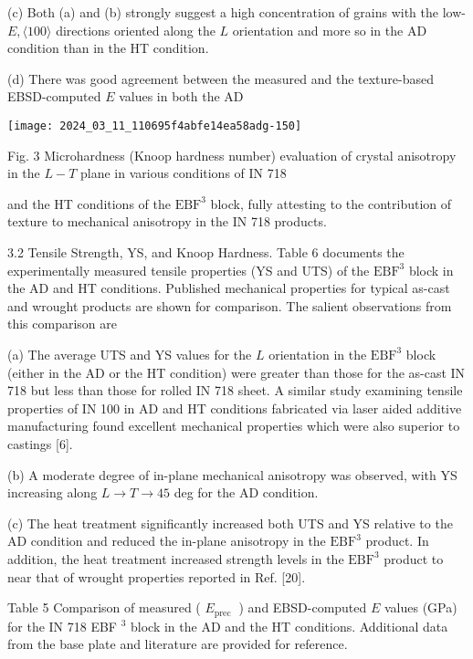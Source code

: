 \documentclass[10pt]{article}
\begin{document}
(c) Both (a) and (b) strongly suggest a high concentration of grains with the low- $E,\langle 100\rangle$ directions oriented along the $L$ orientation and more so in the AD condition than in the HT condition.

(d) There was good agreement between the measured and the texture-based EBSD-computed $E$ values in both the AD

\begin{center}
\texttt{[image: 2024\_03\_11\_110695f4abfe14ea58adg-150]}
\end{center}

Fig. 3 Microhardness (Knoop hardness number) evaluation of crystal anisotropy in the $L-T$ plane in various conditions of IN 718

and the HT conditions of the $\mathrm{EBF}^{3}$ block, fully attesting to the contribution of texture to mechanical anisotropy in the IN 718 products.

3.2 Tensile Strength, YS, and Knoop Hardness. Table 6 documents the experimentally measured tensile properties (YS and UTS) of the $\mathrm{EBF}^{3}$ block in the AD and HT conditions. Published mechanical properties for typical as-cast and wrought products are shown for comparison. The salient observations from this comparison are

(a) The average UTS and YS values for the $L$ orientation in the $\mathrm{EBF}^{3}$ block (either in the AD or the HT condition) were greater than those for the as-cast IN 718 but less than those for rolled IN 718 sheet. A similar study examining tensile properties of IN 100 in AD and HT conditions fabricated via laser aided additive manufacturing found excellent mechanical properties which were also superior to castings [6].

(b) A moderate degree of in-plane mechanical anisotropy was observed, with YS increasing along $L \rightarrow T \rightarrow 45$ deg for the $\mathrm{AD}$ condition.

(c) The heat treatment significantly increased both UTS and YS relative to the AD condition and reduced the in-plane anisotropy in the $\mathrm{EBF}^{3}$ product. In addition, the heat treatment increased strength levels in the $\mathrm{EBF}^{3}$ product to near that of wrought properties reported in Ref. [20].

Table 5 Comparison of measured ( $E_{\text {prec }}$ ) and EBSD-computed $E$ values (GPa) for the IN 718 EBF $^{3}$ block in the AD and the HT conditions. Additional data from the base plate and literature are provided for reference.
\end{document}
